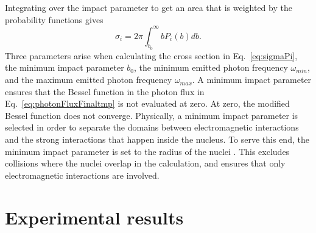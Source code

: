    Integrating over the impact parameter to get an area that 
      is weighted by the probability functions gives \cite{emPCite3,emPCite4}
      \begin{equation}
        \sigma_{i}=2\pi\int^{\infty}_{b_{0}}bP_{i}(b)db.
        \label{eq:sigmaPi}
      \end{equation}
    Three parameters arise when calculating the cross section in Eq.~\ref{eq:sigmaPi}, the 
      minimum impact parameter $b_{0}$, the minimum emitted photon frequency 
      $\omega_{min}$, and the maximum emitted photon frequency $\omega_{max}$.
    A minimum impact parameter ensures that the Bessel 
      function in the photon flux in Eq.~\ref{eq:photonFluxFinaltmp} is not
      evaluated at zero.
    At zero, the modified Bessel function does not converge.
    Physically, a minimum impact parameter is selected in order to separate the
      domains between electromagnetic interactions and the strong interactions 
      that happen inside the nucleus.
    To serve this end, the minimum impact parameter is set to the radius of the
      nuclei \cite{emPCite3,emPCite4}.
    This excludes collisions where the nuclei overlap in the calculation, and 
      ensures that only electromagnetic interactions are involved.

  \section{Experimental results}
